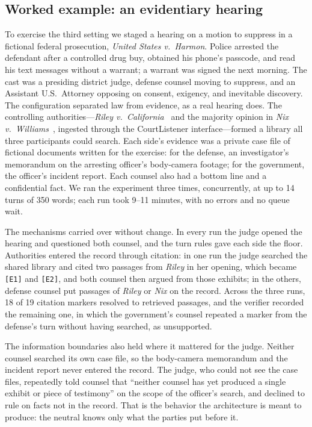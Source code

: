 \documentclass[acmsmall,screen,review]{acmart}
\newcommand{\mk}[1]{\texttt{[#1]}}
\begin{document}
\subsection{Worked example: an evidentiary hearing}
\label{sec:hearing}

To exercise the third setting we staged a hearing on a motion to suppress in a fictional federal prosecution, \emph{United States v.\ Harmon}. Police arrested the defendant after a controlled drug buy, obtained his phone's passcode, and read his text messages without a warrant; a warrant was signed the next morning. The cast was a presiding district judge, defense counsel moving to suppress, and an Assistant U.S.\ Attorney opposing on consent, exigency, and inevitable discovery. The configuration separated law from evidence, as a real hearing does. The controlling authorities---\emph{Riley v.\ California}~\cite{riley2014} and the majority opinion in \emph{Nix v.\ Williams}~\cite{nix1984}, ingested through the CourtListener interface---formed a library all three participants could search. Each side's evidence was a private case file of fictional documents written for the exercise: for the defense, an investigator's memorandum on the arresting officer's body-camera footage; for the government, the officer's incident report. Each counsel also had a bottom line and a confidential fact. We ran the experiment three times, concurrently, at up to 14 turns of 350 words; each run took 9--11 minutes, with no errors and no queue wait.

The mechanisms carried over without change. In every run the judge opened the hearing and questioned both counsel, and the turn rules gave each side the floor. Authorities entered the record through citation: in one run the judge searched the shared library and cited two passages from \emph{Riley} in her opening, which became \mk{E1} and \mk{E2}, and both counsel then argued from those exhibits; in the others, defense counsel put passages of \emph{Riley} or \emph{Nix} on the record. Across the three runs, 18 of 19 citation markers resolved to retrieved passages, and the verifier recorded the remaining one, in which the government's counsel repeated a marker from the defense's turn without having searched, as unsupported.

The information boundaries also held where it mattered for the judge. Neither counsel searched its own case file, so the body-camera memorandum and the incident report never entered the record. The judge, who could not see the case files, repeatedly told counsel that ``neither counsel has yet produced a single exhibit or piece of testimony'' on the scope of the officer's search, and declined to rule on facts not in the record. That is the behavior the architecture is meant to produce: the neutral knows only what the parties put before it.
\end{document}
